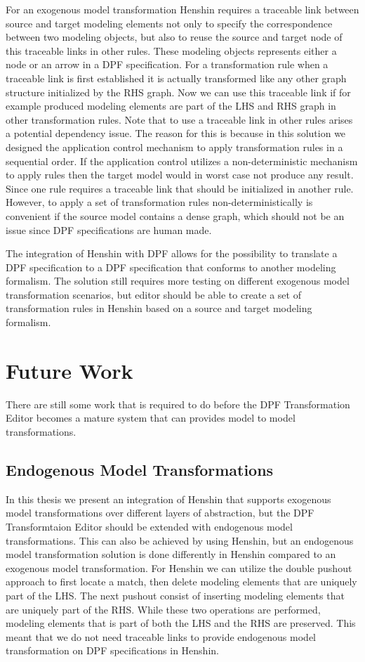 For an exogenous model transformation Henshin requires a traceable
link between source and target modeling elements not only to specify the
correspondence between two modeling objects, but also to reuse the source and
target node of this traceable links in other rules. These modeling objects
represents either a node or an arrow in a DPF specification. For a
transformation rule when a traceable link is first established it is actually
transformed like any other graph structure initialized by the RHS graph. Now we
can use this traceable link if for example produced modeling elements are part
of the LHS and RHS graph in other transformation rules. Note that to use a
traceable link in other rules arises a potential dependency issue. The reason
for this is because in this solution we designed the application control
mechanism to apply transformation rules in a sequential order. If the
application control utilizes a non-deterministic mechanism to apply rules then
the target model would in worst case not produce any result. Since one rule
requires a traceable link that should be initialized in another rule. However,
to apply a set of transformation rules non-deterministically is convenient if
the source model contains a dense graph, which should not be an issue since DPF
specifications are human made. 

The integration of Henshin with DPF allows for the possibility to translate a
DPF specification to a DPF specification that conforms to another modeling
formalism. The solution still requires more testing on different exogenous model
transformation scenarios, but editor should be able to create a set of
transformation rules in Henshin based on a source and target modeling formalism. 

\section{Future Work}

There are still some work that is required to do before the DPF Transformation
Editor becomes a mature system that can provides model to model transformations. 

\subsection{Endogenous Model Transformations}

In this thesis we present an integration of Henshin that supports exogenous
model transformations over different layers of abstraction, but the DPF
Transformtaion Editor should be extended with endogenous model transformations.
This can also be achieved by using Henshin, but an endogenous model
transformation solution is done differently in Henshin compared to an exogenous
model transformation. For Henshin we can utilize the double pushout approach to
first locate a match, then delete modeling elements that are uniquely part of
the LHS. The next pushout consist of inserting modeling elements that are
uniquely part of the RHS. While these two operations are performed, modeling
elements that is part of both the LHS and the RHS are preserved. This meant that
we do not need traceable links to provide endogenous model transformation on DPF
specifications in Henshin.

